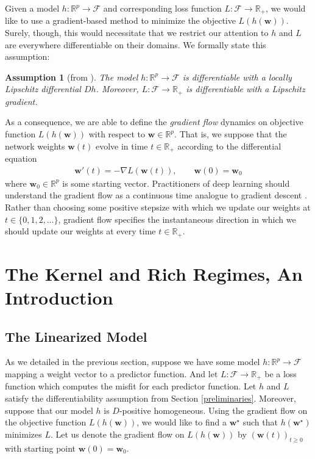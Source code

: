 \documentclass{article}
\newtheorem*{assumption}{Assumption}
\begin{document}
Given a model $h: \mathbb{R}^p \rightarrow \mathcal{F}$ and corresponding loss function $L: \mathcal{F} \rightarrow \mathbb{R}_+$, we would like to use a gradient-based method to minimize the objective $L(h(\boldsymbol{w}))$. Surely, though, this would necessitate that we restrict our attention to $h$ and $L$ are everywhere differentiable on their domains. We formally state this assumption:
\begin{assumption}[from \cite{chizat2018lazy}]\label{assumption1}
The model $h: \mathbb{R}^p \rightarrow \mathcal{F}$ is differentiable with a locally Lipschitz differential $Dh$. Moreover, $L: \mathcal{F} \rightarrow \mathbb{R}_+$ is differentiable with a Lipschitz gradient.
\end{assumption}
As a consequence, we are able to define the \textit{gradient flow} dynamics on objective function $L(h(\boldsymbol{w}))$ with respect to $\boldsymbol{w} \in \mathbb{R}^p$. That is, we suppose that the network weights $\boldsymbol{w}(t)$ evolve in time $t \in \mathbb{R}_+$ according to the differential equation
\begin{align*}
    \boldsymbol{w}'(t) = -\nabla L(\boldsymbol{w}(t)), \qquad \boldsymbol{w}(0) = \boldsymbol{w}_0
\end{align*}
where $\boldsymbol{w}_0 \in \mathbb{R}^p$ is some starting vector. Practitioners of deep learning should understand the gradient flow as a continuous time analogue to gradient descent \cite{wibisono2016}. Rather than choosing some positive stepsize with which we update our weights at $t \in \{0, 1, 2, \ldots \}$, gradient flow specifies the instantaneous direction in which we should update our weights at every time $t \in \mathbb{R}_+$.

\section{The Kernel and Rich Regimes, An Introduction}\label{richkernel}

\subsection{The Linearized Model}
As we detailed in the previous section, suppose we have some model $h: \mathbb{R}^p \rightarrow \mathcal{F}$ mapping a weight vector to a predictor function. And let $L: \mathcal{F} \rightarrow \mathbb{R}_+$ be a loss function which computes the misfit for each predictor function. Let $h$ and $L$ satisfy the differentiability assumption from Section \ref{preliminaries}. Moreover, suppose that our model $h$ is $D$-positive homogeneous. Using the gradient flow on the objective function $L(h(\boldsymbol{w}))$, we would like to find a $\boldsymbol{w}^{\star}$ such that $h(\boldsymbol{w}^{\star})$ minimizes $L$. Let us denote the gradient flow on $L(h(\boldsymbol{w}))$ by $(\boldsymbol{w}(t))_{t \geq 0}$ with starting point $\boldsymbol{w}(0) = \boldsymbol{w}_0$.
\end{document}
